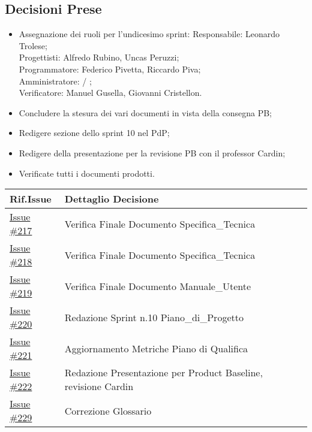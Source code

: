\documentclass[10pt]{article}
\begin{document}
\subsection{Decisioni Prese}
    \begin{itemize}
        \item   Assegnazione dei ruoli per l'undicesimo sprint:
                Responsabile: Leonardo Trolese;\\
                Progettisti: Alfredo Rubino, Uncas Peruzzi;\\
                Programmatore: Federico Pivetta, Riccardo Piva;\\
                Amministratore: / ;\\
                Verificatore: Manuel Gusella, Giovanni Cristellon.
        \item Concludere la stesura dei vari documenti in vista della consegna PB;
        \item Redigere sezione dello sprint 10 nel PdP;
        \item Redigere della presentazione per la revisione PB con il professor Cardin;
        \item Verificate tutti i documenti prodotti.
    \end{itemize}
    \begin{center}
    \begin{tabular}{|>{\centering\arraybackslash}m{3cm}|>{\centering\arraybackslash}m{12cm}|}
	\hline
	\textbf{Rif.Issue} & \textbf{Dettaglio Decisione}\\
	\hline
            \href{https://github.com/SevenBitsSwe/7BitsDocs/issues/217}{Issue \#217} & Verifica Finale Documento Specifica_Tecnica\\
            \href{https://github.com/SevenBitsSwe/7BitsDocs/issues/218}{Issue \#218} & Verifica Finale Documento Specifica_Tecnica\\
            \href{https://github.com/SevenBitsSwe/7BitsDocs/issues/219}{Issue \#219} & Verifica Finale Documento Manuale_Utente\\
            \href{https://github.com/SevenBitsSwe/7BitsDocs/issues/220}{Issue \#220} & Redazione Sprint n.10 Piano_di_Progetto\\
            \href{https://github.com/SevenBitsSwe/7BitsDocs/issues/221}{Issue \#221} & Aggiornamento Metriche Piano di Qualifica\\
            \href{https://github.com/SevenBitsSwe/7BitsDocs/issues/222}{Issue \#222} & Redazione Presentazione per Product Baseline, revisione Cardin\\
            \href{https://github.com/SevenBitsSwe/7BitsDocs/issues/229}{Issue \#229} & Correzione Glossario\\
        \hline
    \end{tabular}
    \end{center}
\end{document}
